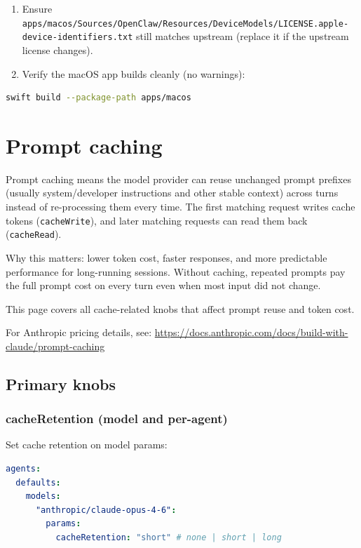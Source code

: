 \begin{enumerate}
  \item Ensure \texttt{apps/macos/Sources/OpenClaw/Resources/DeviceModels/LICENSE.apple-device-identifiers.txt} still matches upstream (replace it if the upstream license changes).
  \item Verify the macOS app builds cleanly (no warnings):
\end{enumerate}


\begin{lstlisting}[language=bash]
swift build --package-path apps/macos
\end{lstlisting}



\clearpage

\section{Prompt caching}


Prompt caching means the model provider can reuse unchanged prompt prefixes (usually system/developer instructions and other stable context) across turns instead of re-processing them every time. The first matching request writes cache tokens (\texttt{cacheWrite}), and later matching requests can read them back (\texttt{cacheRead}).

Why this matters: lower token cost, faster responses, and more predictable performance for long-running sessions. Without caching, repeated prompts pay the full prompt cost on every turn even when most input did not change.

This page covers all cache-related knobs that affect prompt reuse and token cost.

For Anthropic pricing details, see:
\href{https://docs.anthropic.com/docs/build-with-claude/prompt-caching}{https://docs.anthropic.com/docs/build-with-claude/prompt-caching}

\subsection{Primary knobs}


\subsubsection{cacheRetention (model and per-agent)}


Set cache retention on model params:

\begin{lstlisting}[language=yaml]
agents:
  defaults:
    models:
      "anthropic/claude-opus-4-6":
        params:
          cacheRetention: "short" # none | short | long
\end{lstlisting}



